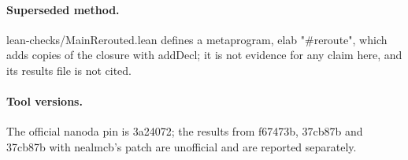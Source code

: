 \paragraph{Superseded method.}
lean-checks/MainRerouted.lean defines a metaprogram, elab "\#reroute", which adds copies of the closure with addDecl; it is not evidence for any claim here, and its results file is not cited. %

\paragraph{Tool versions.}
The official nanoda pin is 3a24072; the results from f67473b, 37cb87b and 37cb87b with nealmcb's patch are unofficial and are reported separately. %
